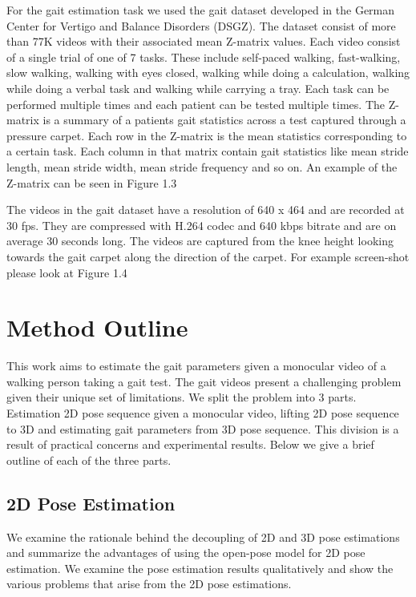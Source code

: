 For the gait estimation task we used the gait dataset developed in the German Center for Vertigo and Balance Disorders (DSGZ). The dataset consist of more than 77K videos with their associated mean Z-matrix values. Each video consist of a single trial of one of 7 tasks. These include self-paced walking, fast-walking, slow walking, walking with eyes closed, walking while doing a calculation, walking while doing a verbal task and walking while carrying a tray. Each task can be performed multiple times and each patient can be tested multiple times. The Z-matrix is a summary of a patients gait statistics across a test captured through a pressure carpet. Each row in the Z-matrix is the mean statistics corresponding to a certain task. Each column in that matrix contain gait statistics like mean stride length, mean stride width, mean stride frequency and so on. An example of the Z-matrix can be seen in Figure 1.3

The videos in the gait dataset have a resolution of 640 x 464 and are recorded at 30 fps. They are compressed with H.264 codec and 640 kbps bitrate and are on average 30 seconds long. The videos are captured from the knee height looking towards the gait carpet along the direction of the carpet. For example screen-shot please look at Figure 1.4

\section{Method Outline}

This work aims to estimate the gait parameters given a monocular video of a walking person taking a gait test. The gait videos present a challenging problem given their unique set of limitations. We split the problem into 3 parts. Estimation 2D pose sequence given a monocular video, lifting 2D pose sequence to 3D and estimating gait parameters from 3D pose sequence. This division is a result of practical concerns and experimental results. Below we give a brief outline of each of the three parts.

\subsection{2D Pose Estimation}

We examine the rationale behind the decoupling of 2D and 3D pose estimations and summarize the advantages of using the open-pose \parencite{cao2016realtime} model for 2D pose estimation. We examine the pose estimation results qualitatively and show the various problems that arise from the 2D pose estimations.

